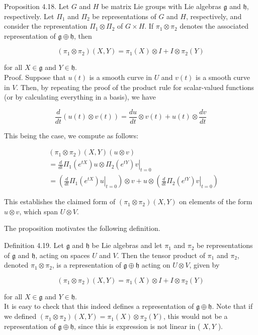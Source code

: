\documentclass[10pt, letterpaper]{article}
\begin{document}
Proposition 4.18. Let $G$ and $H$ be matrix Lie groups with Lie algebras $\mathfrak{g}$ and $\mathfrak{h}$, respectively. Let $\Pi_{1}$ and $\Pi_{2}$ be representations of $G$ and $H$, respectively, and consider the representation $\Pi_{1} \otimes \Pi_{2}$ of $G \times H$. If $\pi_{1} \otimes \pi_{2}$ denotes the associated representation of $\mathfrak{g} \oplus \mathfrak{h}$, then

$$
\left(\pi_{1} \otimes \pi_{2}\right)(X, Y)=\pi_{1}(X) \otimes I+I \otimes \pi_{2}(Y)
$$

for all $X \in \mathfrak{g}$ and $Y \in \mathfrak{h}$.\\
Proof. Suppose that $u(t)$ is a smooth curve in $U$ and $v(t)$ is a smooth curve in $V$. Then, by repeating the proof of the product rule for scalar-valued functions (or by calculating everything in a basis), we have

$$
\frac{d}{d t}(u(t) \otimes v(t))=\frac{d u}{d t} \otimes v(t)+u(t) \otimes \frac{d v}{d t}
$$

This being the case, we compute as follows:

$$
\begin{aligned}
& \left(\pi_{1} \otimes \pi_{2}\right)(X, Y)(u \otimes v) \\
& =\left.\frac{d}{d t} \Pi_{1}\left(e^{t X}\right) u \otimes \Pi_{2}\left(e^{t Y}\right) v\right|_{t=0} \\
& =\left(\left.\frac{d}{d t} \Pi_{1}\left(e^{t X}\right) u\right|_{t=0}\right) \otimes v+u \otimes\left(\left.\frac{d}{d t} \Pi_{2}\left(e^{t Y}\right) v\right|_{t=0}\right)
\end{aligned}
$$

This establishes the claimed form of $\left(\pi_{1} \otimes \pi_{2}\right)(X, Y)$ on elements of the form $u \otimes v$, which span $U \otimes V$.

The proposition motivates the following definition.

Definition 4.19. Let $\mathfrak{g}$ and $\mathfrak{h}$ be Lie algebras and let $\pi_{1}$ and $\pi_{2}$ be representations of $\mathfrak{g}$ and $\mathfrak{h}$, acting on spaces $U$ and $V$. Then the tensor product of $\pi_{1}$ and $\pi_{2}$, denoted $\pi_{1} \otimes \pi_{2}$, is a representation of $\mathfrak{g} \oplus \mathfrak{h}$ acting on $U \otimes V$, given by

$$
\left(\pi_{1} \otimes \pi_{2}\right)(X, Y)=\pi_{1}(X) \otimes I+I \otimes \pi_{2}(Y)
$$

for all $X \in \mathfrak{g}$ and $Y \in \mathfrak{h}$.\\
It is easy to check that this indeed defines a representation of $\mathfrak{g} \oplus \mathfrak{h}$. Note that if we defined $\left(\pi_{1} \otimes \pi_{2}\right)(X, Y)=\pi_{1}(X) \otimes \pi_{2}(Y)$, this would not be a representation of $\mathfrak{g} \oplus \mathfrak{h}$, since this is expression is not linear in ( $X, Y$ ).
\end{document}
